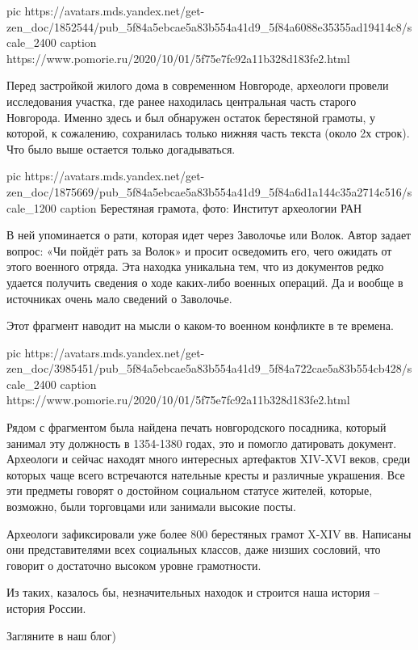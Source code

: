 \ifcmt
pic https://avatars.mds.yandex.net/get-zen_doc/1852544/pub_5f84a5ebcae5a83b554a41d9_5f84a6088e35355ad19414c8/scale_2400
caption https://www.pomorie.ru/2020/10/01/5f75e7fc92a11b328d183fe2.html
\fi

Перед застройкой жилого дома в современном Новгороде, археологи провели
исследования участка, где ранее находилась центральная часть старого Новгорода.
Именно здесь и был обнаружен остаток берестяной грамоты, у которой, к
сожалению, сохранилась только нижняя часть текста (около 2х строк). Что было
выше остается только догадываться.

\ifcmt
  pic https://avatars.mds.yandex.net/get-zen_doc/1875669/pub_5f84a5ebcae5a83b554a41d9_5f84a6d1a144c35a2714c516/scale_1200
  caption Берестяная грамота, фото: Институт археологии РАН
\fi

В ней упоминается о рати, которая идет через Заволочье или Волок. Автор задает
вопрос: «Чи пойдёт рать за Волок» и просит осведомить его, чего ожидать от
этого военного отряда. Эта находка уникальна тем, что из документов редко
удается получить сведения о ходе каких-либо военных операций. Да и вообще в
источниках очень мало сведений о Заволочье.

Этот фрагмент наводит на мысли о каком-то военном конфликте в те времена.

\ifcmt
  pic https://avatars.mds.yandex.net/get-zen_doc/3985451/pub_5f84a5ebcae5a83b554a41d9_5f84a722cae5a83b554cb428/scale_2400
  caption https://www.pomorie.ru/2020/10/01/5f75e7fc92a11b328d183fe2.html
\fi

Рядом с фрагментом была найдена печать новгородского посадника, который занимал
эту должность в 1354-1380 годах, это и помогло датировать документ. Археологи и
сейчас находят много интересных артефактов XIV-XVI веков, среди которых чаще
всего встречаются нательные кресты и различные украшения. Все эти предметы
говорят о достойном социальном статусе жителей, которые, возможно, были
торговцами или занимали высокие посты.

Археологи зафиксировали уже более 800 берестяных грамот X-XIV вв. Написаны они
представителями всех социальных классов, даже низших сословий, что говорит о
достаточно высоком уровне грамотности.

Из таких, казалось бы, незначительных находок и строится наша история – история
России.

Загляните в наш блог)

